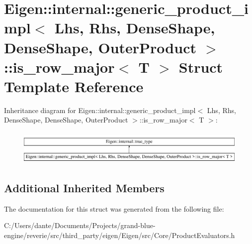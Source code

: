 \hypertarget{struct_eigen_1_1internal_1_1generic__product__impl_3_01_lhs_00_01_rhs_00_01_dense_shape_00_01_deb11e8f3beed15984390667915ab7b26a}{}\section{Eigen\+::internal\+::generic\+\_\+product\+\_\+impl$<$ Lhs, Rhs, Dense\+Shape, Dense\+Shape, Outer\+Product $>$\+::is\+\_\+row\+\_\+major$<$ T $>$ Struct Template Reference}
\label{struct_eigen_1_1internal_1_1generic__product__impl_3_01_lhs_00_01_rhs_00_01_dense_shape_00_01_deb11e8f3beed15984390667915ab7b26a}
Inheritance diagram for Eigen\+::internal\+::generic\+\_\+product\+\_\+impl$<$ Lhs, Rhs, Dense\+Shape, Dense\+Shape, Outer\+Product $>$\+::is\+\_\+row\+\_\+major$<$ T $>$\+:\begin{figure}[H]
\begin{center}
\leavevmode
\includegraphics[height=1.694402cm]{struct_eigen_1_1internal_1_1generic__product__impl_3_01_lhs_00_01_rhs_00_01_dense_shape_00_01_deb11e8f3beed15984390667915ab7b26a}
\end{center}
\end{figure}
\subsection*{Additional Inherited Members}


The documentation for this struct was generated from the following file\+:\begin{DoxyCompactItemize}
\item 
C\+:/\+Users/dante/\+Documents/\+Projects/grand-\/blue-\/engine/reverie/src/third\+\_\+party/eigen/\+Eigen/src/\+Core/Product\+Evaluators.\+h\end{DoxyCompactItemize}
